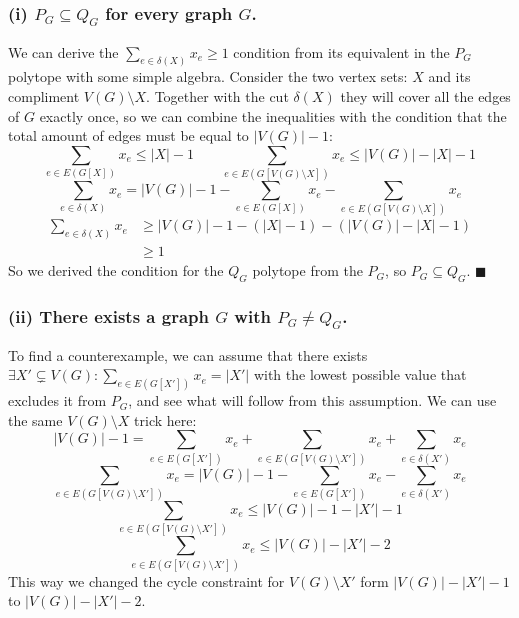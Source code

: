 \documentclass{article}
\begin{document}
  \subsubsection*{(i) $P_G \subseteq Q_G$ for every graph $G$.}
  We can derive the $\sum_{e\in\delta(X)}x_{e} \geq 1$ condition from its equivalent in the $P_G$ polytope with some simple algebra.
  Consider the two vertex sets: $X$ and its compliment $V(G) \setminus X$.
  Together with the cut $\delta(X)$ they will cover all the edges of $G$ exactly once,
  so we can combine the inequalities with the condition that the total amount of edges must be equal to $|V(G)|-1$:
  \[ \sum_{e\in E(G[X])} x_{e} \leq |X|-1 \qquad
     \sum_{e\in E(G[V(G) \setminus X])} x_{e} \leq |V(G)|-|X|-1 \]
  \[ \sum_{e\in\delta(X)}x_{e} = |V(G)|-1 - \sum_{e\in E(G[X])} x_{e} - \sum_{e\in E(G[V(G) \setminus X])} x_{e} \]
  \begin{align*}
     \sum_{e\in\delta(X)}x_{e} &\geq |V(G)|-1 - (|X|-1) - (|V(G)|-|X|-1)\\
     &\geq 1
  \end{align*}
  So we derived the condition for the $Q_G$ polytope from the $P_G$, so $P_G \subseteq Q_G$.
  $\blacksquare$

  \subsubsection*{(ii) There exists a graph $G$ with $P_G \neq Q_G$.}
  To find a counterexample, we can assume that there exists $\exists X' \subsetneq V(G) : \sum_{e\in E(G[X'])} x_{e} = |X'|$
  with the lowest possible value that excludes it from $P_G$, and see what will follow from this assumption.
  We can use the same $V(G) \setminus X$ trick here:
  \[ |V(G)| - 1 = \sum_{e\in E(G[X'])} x_{e} + \sum_{e\in E(G[V(G) \setminus X'])} x_{e} + \sum_{e\in\delta(X')}x_{e} \]
  \[ \sum_{e\in E(G[V(G) \setminus X'])} x_{e} = |V(G)| - 1 - \sum_{e\in E(G[X'])} x_{e} - \sum_{e\in\delta(X')}x_{e} \]
  \[ \sum_{e\in E(G[V(G) \setminus X'])} x_{e} \leq |V(G)| - 1 - |X'| - 1 \]
  \[ \sum_{e\in E(G[V(G) \setminus X'])} x_{e} \leq |V(G)| - |X'| - 2 \]
  This way we changed the cycle constraint for $V(G) \setminus X'$ form $|V(G)| - |X'| - 1$ to $|V(G)| - |X'| - 2$.
\end{document}
